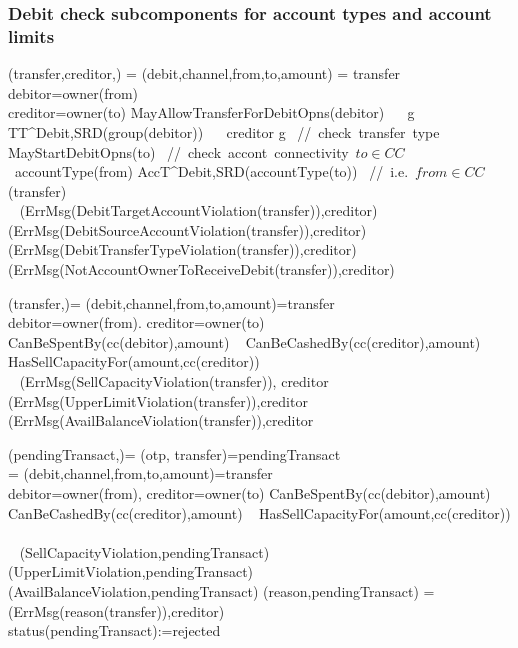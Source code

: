  \subsubsection{Debit check subcomponents for account types and account limits}
 \begin{asm}
 	(transfer,creditor,)  =\+
 	\LET (debit,channel,from,to,amount) = transfer \\
 	\LET debitor=owner(from)\\
 	\IF creditor=owner(to) \AND MayAllowTransferForDebitOpns(debitor) 
 	\+
 	\THEN~ \IF~\FORSOME g \in TT^{Debit,SRD}(group(debitor))
 	~~ creditor \in g \mbox{  // check transfer type}
 	\+
 	\THEN ~ \IF MayStartDebitOpns(to)    \mbox{  // check accont connectivity $to \in CC$}\+
 	\THEN ~\IF accountType(from) \in AccT^{Debit,SRD}(accountType(to))
 	\mbox{ // i.e. $from \in CC$}\+
 	\THEN  ~ (transfer) \\
 	\ELSE ~ 
 	(ErrMsg(DebitTargetAccountViolation(transfer)),\TO creditor) \- 
 	\ELSE ~ 
 	(ErrMsg(DebitSourceAccountViolation(transfer)),\TO creditor)  \-
 	\ELSE ~ 
 	(ErrMsg(DebitTransferTypeViolation(transfer)),\TO creditor) \-
 	\ELSE ~ 
 	(ErrMsg(NotAccountOwnerToReceiveDebit(transfer)),\TO creditor)
 \end{asm}

 \begin{asm}
 	(transfer,)= \+
 	\LET (debit,channel,from,to,amount)=transfer \\
 	\LET debitor=owner(from). creditor=owner(to)\\
 	\IF CanBeSpentBy(cc(debitor),amount) \+
 	\THEN ~ \IF CanBeCashedBy(cc(creditor),amount) \+
 	\THEN ~ \IF HasSellCapacityFor(amount,cc(creditor)) \+
 	\THEN ~  \\
 	\ELSE~
 	(ErrMsg(SellCapacityViolation(transfer)),
 	\TO creditor\-
 	\ELSE~
 	(ErrMsg(UpperLimitViolation(transfer)),\TO creditor\-
 	\ELSE 
 	~ (ErrMsg(AvailBalanceViolation(transfer)),\TO creditor
 \end{asm}
  
 \begin{asm}
 	(pendingTransact,)=\+
 	\LET (otp, transfer)=pendingTransact\\ 
 	\LET = (debit,channel,from,to,amount)=transfer\\
 	\LET debitor=owner(from), creditor=owner(to)\+
 	\IF CanBeSpentBy(cc(debitor),amount) \+
 	\THEN ~ \IF CanBeCashedBy(cc(creditor),amount) \+
 	\THEN ~ \IF HasSellCapacityFor(amount,cc(creditor)) \+
 	\THEN ~  \\
 	\ELSE ~ 
 	(SellCapacityViolation,pendingTransact) \-
 	\ELSE ~ 
 	(UpperLimitViolation,pendingTransact) \-
 	\ELSE ~  
 	(AvailBalanceViolation,pendingTransact) \dec\-
 	\WHERE \+
 	(reason,pendingTransact)  =\+
 	(ErrMsg(reason(transfer)),\TO creditor)\\
 	status(pendingTransact):=rejected  
 \end{asm}
 
